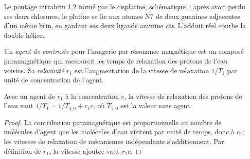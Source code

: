 \begin{omfigure}

{\small Le pontage intrabrin 1,2 formé par le cisplatine, schématique~:
après avoir perdu ses deux chlorures, le platine se lie aux atomes N7 de
deux guanines adjacentes d'un même brin, en gardant ses deux ligands
ammine \textit{cis}. L'adduit réel courbe la double hélice.}
\end{omfigure}

\begin{definition}\label{def:b3:bioinorganic:contrast}
Un \emph{agent de contraste} pour l'imagerie par
résonance magnétique est un composé paramagnétique qui raccourcit les temps
de relaxation des protons de l'eau voisins. Sa \emph{relaxivité} $r_1$ est l'augmentation de la
vitesse de relaxation $1/T_1$ par unité de concentration de l'agent.
\end{definition}

\begin{proposition}\label{prop:b3:bioinorganic:relaxivity}
Avec un agent de  $r_1$ à la concentration $c$, la vitesse de relaxation des protons
de l'eau vaut $1/T_1 = 1/T_{1,0} + r_1c$, où $T_{1,0}$ est la valeur sans agent.
\end{proposition}

\begin{proof}
La contribution paramagnétique est proportionnelle au nombre de molécules
d'agent que les molécules d'eau visitent par unité de temps, donc à $c$~; les vitesses de relaxation de
mécanismes indépendants s'additionnent. Par définition de $r_1$, la vitesse ajoutée vaut $r_1c$.
\end{proof}

